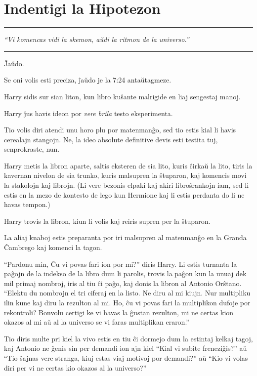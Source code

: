 \chapter{Indentigi la Hipotezon}

\begin{center}\rule{3in}{0.4pt}\end{center}

\emph{``Vi komencas vidi la skemon, aŭdi la ritmon de la universo.''}

\begin{center}\rule{3in}{0.4pt}\end{center}

Ĵaŭdo.

Se oni volis esti preciza, ĵaŭdo je la 7:24 antaŭtagmeze.

Harry sidis sur sian liton, kun libro kuŝante malrigide en liaj
sengestaj manoj.

Harry ĵus havis ideon por \emph{vere brila} testo eksperimenta.

Tio volis diri atendi unu horo plu por matenmanĝo, sed tio estis kial
li havis cerealajn stangojn. Ne, la ideo absolute definitive devis
esti testita tuj, senprokraste, nun.

Harry metis la libron aparte, saltis eksteren de sia lito, kuris
ĉirkaŭ la lito, tiris la kavernan nivelon de sia trunko, kuris
malsupren la ŝtuparon, kaj komencis movi la stakolojn kaj librojn. (Li
vere bezonis elpaki kaj akiri libroŝrankojn iam, sed li estis en la
mezo de kontesto de lego kun Hermione kaj li estis perdanta do li ne
havas tempon.)

Harry trovis la libron, kiun li volis kaj reiris supren per la ŝtuparon.

La aliaj knaboj estis preparanta por iri malsupren al matenmanĝo en la
Granda Ĉambrego kaj komenci la tagon.

``Pardonu min, Ĉu vi povas fari ion por mi?'' diris Harry. Li estis
turnanta la paĝojn de la indekso de la libro dum li parolis, trovis la
paĝon kun la unuaj dek mil primaj nombroj, iris al tiu ĉi paĝo, kaj
donis la libron al Antonio Orŝtano. ``Elektu du nombrojn el tri
ciferaj en la listo. Ne diru al mi kiujn. Nur multipliku ilin kune kaj
diru la rezulton al mi. Ho, ĉu vi povas fari la multiplikon dufoje por
rekontroli? Bonvolu certigi ke vi havas la ĝustan rezulton, mi ne
certas kion okazos al mi aŭ al la universo se vi faras multiplikan
eraron.''

Tio diris multe pri kiel la vivo estis en tiu ĉi dormejo dum la
estintaj kelkaj tagoj, kaj Antonio ne ĝenis sin per demandi ion ajn
kiel ``Kial vi subite freneziĝis?'' aŭ ``Tio ŝajnas vere stranga, kiuj
estas viaj motivoj por demandi?'' aŭ ``Kio vi volas diri per vi ne
certas kio okazos al la universo?''

